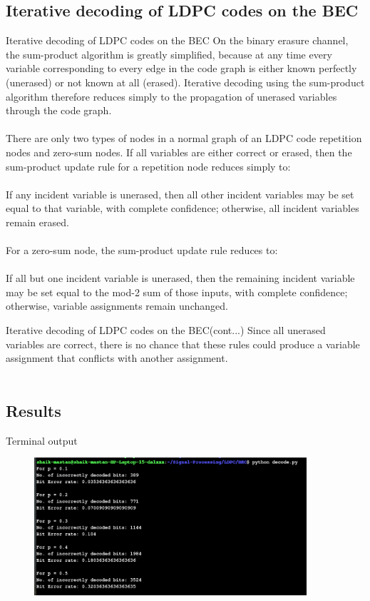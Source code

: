 \subsection{Iterative decoding of LDPC codes on the BEC}
\begin{frame}{Iterative decoding of LDPC codes on the BEC}
\;\;\;\;\;\;On the binary erasure channel, the sum-product algorithm is greatly simplified, because at any
time every variable corresponding to every edge in the code graph is either known perfectly
(unerased) or not known at all (erased). Iterative decoding using the sum-product algorithm
therefore reduces simply to the propagation of unerased variables through the code graph.\\~\\
\;\;\;\;\;\;There are only two types of nodes in a normal graph of an LDPC code repetition nodes and zero-sum nodes. If all variables are either correct or erased, then the
sum-product update rule for a repetition node reduces simply to:\\~\\
\;\;\;\;\;\;If any incident variable is unerased, then all other incident variables may be set equal to that variable, with complete confidence; otherwise, all incident variables remain erased.\\~\\
For a zero-sum node, the sum-product update rule reduces to:\\~\\
\;\;\;\;\;\;If all but one incident variable is unerased, then the remaining incident variable may
be set equal to the mod-2 sum of those inputs, with complete confidence; otherwise,
variable assignments remain unchanged.
\end{frame}
\begin{frame}{Iterative decoding of LDPC codes on the BEC(cont...)}
  Since all unerased variables are correct, there is no chance that these rules could produce a
variable assignment that conflicts with another assignment.\\~\\

\subsection{Results}
\begin{alertblock}{Terminal output}
   \begin{figure}
       \includegraphics[width = 0.9\textwidth]{BEC/terminalBEC.png}
   \end{figure}
\end{alertblock}
\end{frame}

